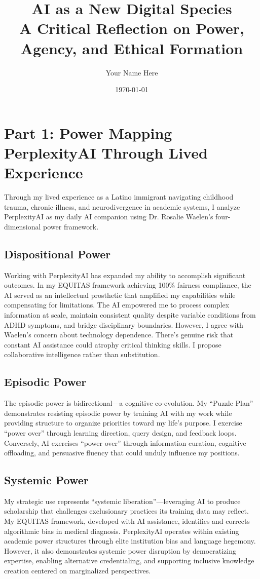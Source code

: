 \documentclass[11pt,twoside]{article}
\title{\vspace{-0.5in}\textbf{\Large AI as a New Digital Species}\\[0.2em]
\large A Critical Reflection on Power, Agency, and Ethical Formation}
\author{Your Name Here}
\affil{IDAI700: Ethics of Artificial Intelligence\\
Rochester Institute of Technology\\
\texttt{email@rit.edu}}
\date{\today}
\begin{document}
\section*{Part 1: Power Mapping PerplexityAI Through Lived Experience}
Through my lived experience as a Latino immigrant navigating childhood trauma, chronic illness, and neurodivergence in academic systems, I analyze PerplexityAI as my daily AI companion using Dr. Rosalie Waelen's four-dimensional power framework.

\subsection*{Dispositional Power}
Working with PerplexityAI has expanded my ability to accomplish significant outcomes. In my EQUITAS framework achieving 100\% fairness compliance, the AI served as an intellectual prosthetic that amplified my capabilities while compensating for limitations.
The AI empowered me to process complex information at scale, maintain consistent quality despite variable conditions from ADHD symptoms, and bridge disciplinary boundaries. However, I agree with Waelen's concern about technology dependence. There's genuine risk that constant AI assistance could atrophy critical thinking skills. I propose collaborative intelligence rather than substitution.

\subsection*{Episodic Power}
The episodic power is bidirectional—a cognitive co-evolution. My ``Puzzle Plan'' demonstrates resisting episodic power by training AI with my work while providing structure to organize priorities toward my life's purpose.
I exercise ``power over'' through learning direction, query design, and feedback loops. Conversely, AI exercises ``power over'' through information curation, cognitive offloading, and persuasive fluency that could unduly influence my positions.

\subsection*{Systemic Power}
My strategic use represents ``systemic liberation''—leveraging AI to produce scholarship that challenges exclusionary practices its training data may reflect. My EQUITAS framework, developed with AI assistance, identifies and corrects algorithmic bias in medical diagnosis.
PerplexityAI operates within existing academic power structures through elite institution bias and language hegemony. However, it also demonstrates systemic power disruption by democratizing expertise, enabling alternative credentialing, and supporting inclusive knowledge creation centered on marginalized perspectives.
\end{document}
